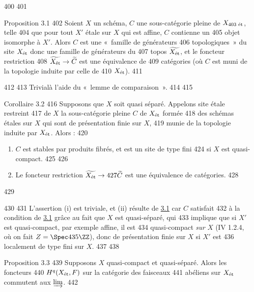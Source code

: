    400	
   401	\begin{enonce*}{Proposition 3.1}
   402	Soient $X$ un schéma, $C$ une sous-catégorie pleine de $X_{\text{\rm
   403	    ét}}$, telle
   404	que pour tout $X'$ étale sur $X$ qui est affine, $C$ contienne un
   405	objet isomorphe à $X'$. Alors $C$ est une « famille de générateurs
   406	topologiques » du site $X_{\text{\rm ét}}$ donc une famille de générateurs du
   407	topos $\widetilde{X_{\text{\rm ét}}}$, et le foncteur restriction
   408	$\widetilde{X_{\text{\rm ét}}} \to \widetilde{C}$  est une équivalence de
   409	catégories (où $C$ est muni de la topologie induite par celle de
   410	    $X_{\text{\rm ét}}$).
   411	\end{enonce*}
   412	
   413	Trivial\pageoriginale à l'aide du « lemme de comparaison ».
   414	
   415	\begin{enonce*}{Corollaire 3.2}
   416	Supposons que $X$ soit quasi séparé. Appelons site étale restreint
   417	de $X$ la sous-catégorie pleine $C$ de $X_{\text{\rm ét}}$ formée
   418	des schémas étales sur $X$ qui sont de présentation finie sur $X$,
   419	munie de la topologie induite par $X_{\text{\rm ét}}$. Alors :
   420	\begin{enumerate}
   421	\renewcommand{\theenumi}{\roman{enumi}}
   422	\renewcommand{\labelenumi}{(\theenumi)}
   423	\item $C$ est stables par produits fibrés, et est un site de type fini
   424	si $X$ est quasi-compact.
   425	
   426	\item Le foncteur restriction $\widetilde{X_{\text{\rm ét}}} \to
   427	\widetilde{C}$ est une équivalence de catégories.
   428	\end{enumerate}
   429	\end{enonce*}
   430	
   431	L'assertion (i) est triviale, et (ii) résulte de \hyperref[VII.prop3.1]{3.1} car $C$ satisfait
   432	à la condition de \hyperref[VII.prop3.1]{3.1} grâce au fait que $X$ est quasi-séparé, qui
   433	implique que si $X'$ est quasi-compact, par exemple affine, il est
   434	quasi-compact \emph{sur} $X$ (\EGA IV 1.2.4, où on fait $Z = \Spec
   435	\ZZ$), donc de présentation finie sur $X$ si $X'$ est
   436	localement de type fini sur $X$.
   437	
   438	\begin{enonce*}{Proposition 3.3}
   439	Supposons $X$ quasi-compact et quasi-séparé. Alors les foncteurs
   440	$H^{q} (X_{\text{\rm ét}}, F)$ sur la catégorie des faisceaux
   441	abéliens sur $X_{\text{\rm ét}}$ commutent aux $\varinjlim$.
   442	\end{enonce*}
